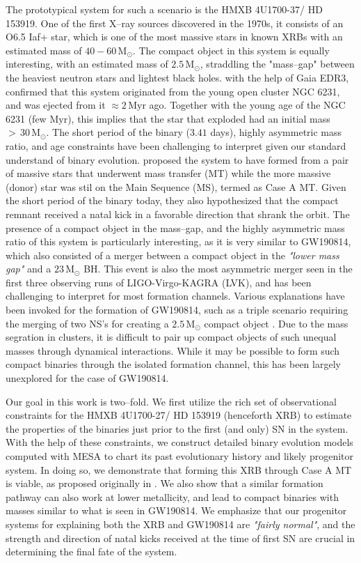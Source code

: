 \documentclass[linenumbers,trackchanges,twocolumn]{aastex701}
\newcommand{\Mdot}{\mathrm{M}_{\odot}}
\newcommand{\Myr}{\mathrm{Myr}}
\begin{document}
The prototypical system for such a scenario is the HMXB 4U1700-37/ HD 153919. One of the first X--ray sources discovered in the 1970s, it consists of an O6.5 Iaf+ star, which is one of the most massive stars in known XRBs with an estimated mass of $40-60\,\Mdot$. The compact object in this system is equally interesting, with an estimated mass of $2.5\,\Mdot$, straddling the "mass--gap" between the heaviest neutron stars and lightest black holes. with the help of Gaia EDR3, \cite{2021A&A...655A..31V} confirmed that this system originated from the young open cluster NGC 6231, and was ejected from it $\approx 2\,\Myr$ ago. Together with the young age of the NGC 6231 (few $\Myr$), this implies that the star that exploded had an initial mass $>\,30\,\Mdot$. The short period of the binary ($3.41$ days), highly asymmetric mass ratio, and age constraints have been challenging to interpret given our standard understand of binary evolution. \cite{2021A&A...655A..31V} proposed the system to have formed from a pair of massive stars that underwent mass transfer (MT) while the more massive (donor) star was stil on the Main Sequence (MS), termed as Case A MT. Given the short period of the binary today, they also hypothesized that the compact remnant received a natal kick in a favorable direction that shrank the orbit. The presence of a compact object in the mass--gap, and the highly asymmetric mass ratio of this system is particularly interesting, as it is very similar to GW190814, which also consisted of a merger between a compact object in the \textit{"lower mass gap"} and a $23\,\Mdot$ BH. This event is also the most asymmetric merger seen in the first three observing runs of LIGO-Virgo-KAGRA (LVK), and has been challenging to interpret for most formation channels. Various explanations have been invoked for the formation of GW190814, such as a triple scenario requiring the merging of two NS's for creating a $2.5\,\Mdot$ compact object \cite{2021MNRAS.500.1817L}. Due to the mass segration in clusters, it is difficult to pair up compact objects of such unequal masses through dynamical interactions. While it may be possible to form such compact binaries through the isolated formation channel, this has been largely unexplored for the case of GW190814.

Our goal in this work is two--fold. We first utilize the rich set of observational constraints for the HMXB 4U1700-27/ HD 153919 (henceforth XRB) to estimate the properties of the binaries just prior to the first (and only) SN in the system. With the help of these constraints, we construct detailed binary evolution models computed with MESA to chart its past evolutionary history and likely progenitor system. In doing so, we demonstrate that forming this XRB through Case A MT is viable, as proposed originally in \cite{2021A&A...655A..31V}. We also show that a similar formation pathway can also work at lower metallicity, and lead to compact binaries with masses similar to what is seen in GW190814. We emphasize that our progenitor systems for explaining both the XRB and GW190814 are \textit{"fairly normal"}, and the strength and direction of natal kicks received at the time of first SN are crucial in determining the final fate of the system.
\end{document}
